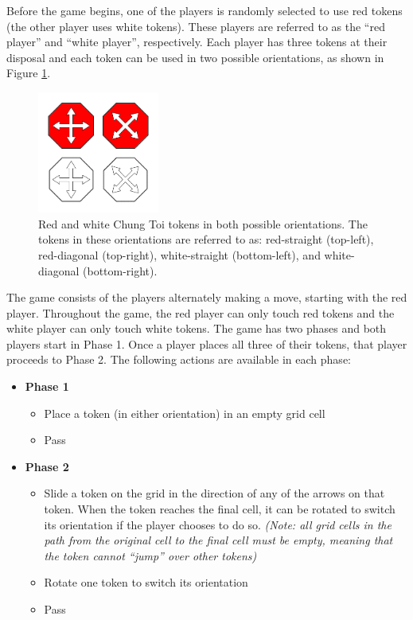 \documentclass[11pt,a4paper]{report}
\begin{document}
Before the game begins, one of the players is randomly selected to use red tokens (the other player uses white tokens). These players are referred to as the ``red player'' and ``white player'', respectively. Each player has three tokens at their disposal and each token can be used in two possible orientations, as shown in Figure \ref{chung-toi-tokens}.

\begin{figure}[htbp]
	\begin{center}
		\includegraphics[width=40mm]{chung_toi_tokens.png}
		\caption[Chung Toi tokens]{Red and white Chung Toi tokens in both possible orientations. The tokens in these orientations are referred to as: red-straight (top-left), red-diagonal (top-right), white-straight (bottom-left), and white-diagonal (bottom-right).}
		\label{chung-toi-tokens}
	\end{center}
\end{figure}

The game consists of the players alternately making a move, starting with the red player. Throughout the game, the red player can only touch red tokens and the white player can only touch white tokens. The game has two phases and both players start in Phase 1. Once a player places all three of their tokens, that player proceeds to Phase 2. The following actions are available in each phase:

\begin{itemize}

	\item \textbf{Phase 1}
		\begin{itemize}
			\item Place a token (in either orientation) in an empty grid cell
			\item Pass
		\end{itemize}

	\item \textbf{Phase 2}
		\begin{itemize}
			\item Slide a token on the grid in the direction of any of the arrows on that token. When the token reaches the final cell, it can be rotated to switch its orientation if the player chooses to do so. \emph{(Note: all grid cells in the path from the original cell to the final cell must be empty, meaning that the token cannot ``jump'' over other tokens)}
			\item Rotate one token to switch its orientation
			\item Pass
		\end{itemize}

\end{itemize}
\end{document}
